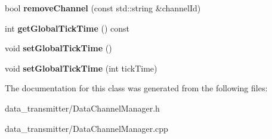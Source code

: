 \begin{DoxyCompactItemize}
\item 
\hypertarget{classDataChannelManager_a485c2117d3f48d4241237d54f743f755}{bool {\bfseries remove\-Channel} (const std\-::string \&channel\-Id)}\label{classDataChannelManager_a485c2117d3f48d4241237d54f743f755}

\item 
\hypertarget{classDataChannelManager_aa9b838fcf72a70090970d0323b1acd04}{int {\bfseries get\-Global\-Tick\-Time} () const }\label{classDataChannelManager_aa9b838fcf72a70090970d0323b1acd04}

\item 
\hypertarget{classDataChannelManager_a9ba33da1945db20003a5b173a19a0ee6}{void {\bfseries set\-Global\-Tick\-Time} ()}\label{classDataChannelManager_a9ba33da1945db20003a5b173a19a0ee6}

\item 
\hypertarget{classDataChannelManager_a8703d69d6eb0c91274046c15b57323bf}{void {\bfseries set\-Global\-Tick\-Time} (int tick\-Time)}\label{classDataChannelManager_a8703d69d6eb0c91274046c15b57323bf}

\end{DoxyCompactItemize}


The documentation for this class was generated from the following files\-:\begin{DoxyCompactItemize}
\item 
data\-\_\-transmitter/Data\-Channel\-Manager.\-h\item 
data\-\_\-transmitter/Data\-Channel\-Manager.\-cpp\end{DoxyCompactItemize}

